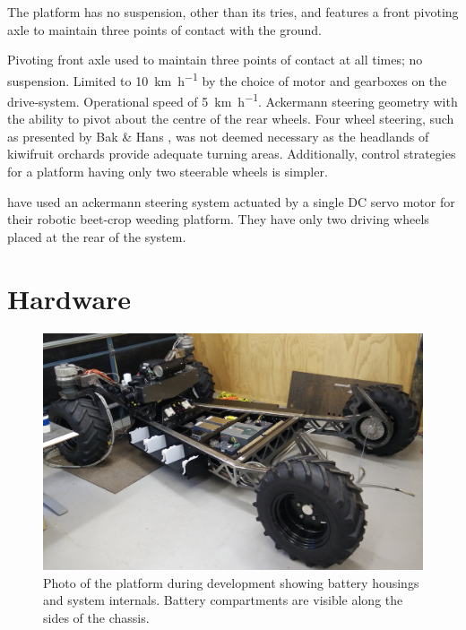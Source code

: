 \documentclass[preprint,authoryear,12pt]{elsarticle}
\begin{document}
    The platform has no suspension, other than its tries, and features a front pivoting axle to maintain three points of contact with the ground.
    

    Pivoting front axle used to maintain three points of contact at all times; no suspension.
    Limited to \SI{10}{\kilo\meter\per\hour} by the choice of motor and gearboxes on the drive-system.
    Operational speed of \SI{5}{\kilo\meter\per\hour}.
    Ackermann steering geometry with the ability to pivot about the centre of the rear wheels.
    Four wheel steering, such as presented by Bak \& Hans \citep{Bak2004}, was not deemed necessary as the headlands of kiwifruit orchards provide adequate turning areas.
    Additionally, control strategies for a platform having only two steerable wheels is simpler.



    \citep{Astrand2002} have used an ackermann steering system actuated by a single DC servo motor for their robotic beet-crop weeding platform. They have only two driving wheels placed at the rear of the system.


\section{Hardware}
\label{sect:hardware}

    \begin{figure}[htb]
        \centering
        \includegraphics[width=\linewidth]{imgs/photos/development_wBatteryBoxes.jpg}
        \caption{
            Photo of the platform during development showing battery housings and system internals.
            Battery compartments are visible along the sides of the chassis.
        }
        \label{fig:AMMP}
    \end{figure}
\end{document}
